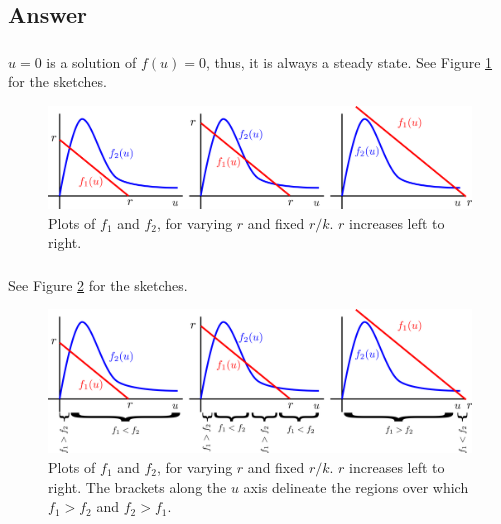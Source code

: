 \documentclass[]{article}
\newcommand{\fig}[1]{Figure \ref{#1}}
\begin{document}
\begin{Answ}
\subsection{Answer}
\subsubsection{}
$u=0$ is a solution of $f(u)=0$, thus, it is always a steady state. See \fig{f1_f2} for the sketches.
\begin{figure}[h!!!tb]
\centering
\includegraphics[width=\textwidth]{../../Pictures/f1_f2.png}
\caption{\label{f1_f2} Plots of $f_1$ and $f_2$, for varying $r$ and fixed $r/k$. $r$ increases left to right.}
\end{figure}
\subsubsection{}
See \fig{f1_f2_positivity} for the sketches.
\begin{figure}[h!!!tb]
\includegraphics[width=\textwidth]{../../Pictures/f1_f2_positivity.png}
\caption{\label{f1_f2_positivity} Plots of $f_1$ and $f_2$, for varying $r$ and fixed $r/k$. $r$ increases left to right. The brackets along the $u$ axis delineate the regions over which $f_1>f_2$ and $f_2>f_1$.}
\end{figure}

\end{Answ}
\end{document}
